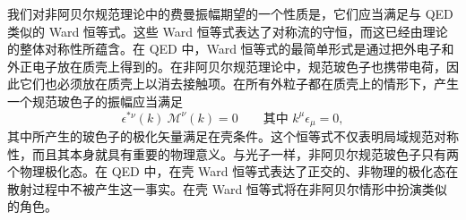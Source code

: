 我们对非阿贝尔规范理论中的费曼振幅期望的一个性质是，它们应当满足与 QED 类似的 Ward 恒等式。这些 Ward 恒等式表达了对称流的守恒，而这已经由理论的整体对称性所蕴含。在 QED 中，Ward 恒等式的最简单形式是通过把外电子和外正电子放在质壳上得到的。在非阿贝尔规范理论中，规范玻色子也携带电荷，因此它们也必须放在质壳上以消去接触项。在所有外粒子都在质壳上的情形下，产生一个规范玻色子的振幅应当满足
\begin{equation}
  \epsilon^{*\nu}(k)\ \mathcal{M}^\nu(k) = 0
  \qquad\text{其中 } k^\mu\epsilon_\mu = 0 ,
  \label{eq:16.10}
\end{equation}
其中所产生的玻色子的极化矢量满足在壳条件。这个恒等式不仅表明局域规范对称性，而且其本身就具有重要的物理意义。与光子一样，非阿贝尔规范玻色子只有两个物理极化态。在 QED 中，在壳 Ward 恒等式表达了正交的、非物理的极化态在散射过程中不被产生这一事实。在壳 Ward 恒等式将在非阿贝尔情形中扮演类似的角色。

